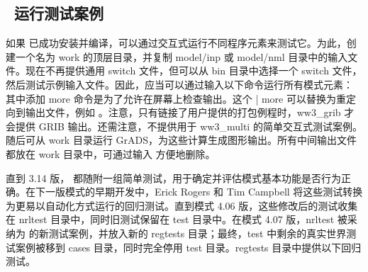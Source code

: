 \vssub
\subsection{~运行测试案例} \label{sec:tests}
\vssub

如果 \ws{} 已成功安装并编译，可以通过交互式运行不同程序元素来测试它。为此，创建一个名为 {\file work} 的顶层目录，并复制 {\file model/inp} 或 {\file model/nml} 目录中的输入文件。现在不再提供通用 switch 文件，但可以从 {\file bin} 目录中选择一个 switch 文件，然后测试示例输入文件。因此，应当可以通过输入以下命令运行所有模式元素：
其中添加 {\code more} 命令是为了允许在屏幕上检查输出。这个 {\code | more} 可以替换为重定向到输出文件，例如 。注意，只有链接了用户提供的打包例程时，{\code ww3\_grib} 才会提供 GRIB 输出。还需注意，不提供用于 {\file ww3\_multi} 的简单交互式测试案例。随后可从 work 目录运行 GrADS，为这些计算生成图形输出。所有中间输出文件都放在 {\file work} 目录中，可通过输入  方便地删除。

直到 3.14 版，\ws{} 都随附一组简单测试，用于确定并评估模式基本功能是否行为正确。在下一版模式的早期开发中，Erick Rogers 和 Tim Campbell 将这些测试转换为更易以自动化方式运行的回归测试。直到模式 4.06 版，这些修改后的测试收集在 {\file nrltest} 目录中，同时旧测试保留在 {\file test} 目录中。在模式 4.07 版，{\file nrltest} 被采纳为 \ws{} 的新测试案例，并放入新的 {\file regtests} 目录；最终，{\file test} 中剩余的真实世界测试案例被移到 {\file cases} 目录，同时完全停用 {\file test} 目录。{\file regtests} 目录中提供以下回归测试。

